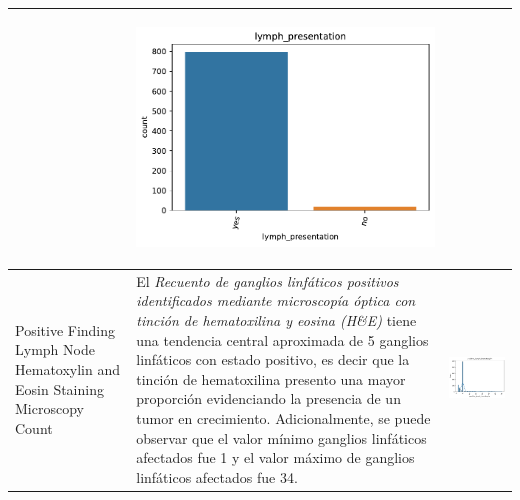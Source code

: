 \begin{table}[!htb]
\begin{threeparttable}
\begin{tabular}{p{2.5cm} p{7cm} p{6.5cm}}
			& \begin{center}\includegraphics[width=1\linewidth]{NOTEBOOK/IMAGENES_DESCRIPTIVAS/28_lymph_presentation}\end{center}
			\\ \hline
			
			Positive Finding Lymph Node Hematoxylin and Eosin Staining Microscopy Count
			& El \textit{Recuento de ganglios linfáticos positivos identificados mediante microscopía óptica con tinción de hematoxilina y eosina (H\&E)} tiene una tendencia central aproximada de 5 ganglios linfáticos con estado positivo, es decir que la tinción de hematoxilina presento una mayor proporción evidenciando la presencia de un tumor en crecimiento. Adicionalmente, se puede observar que  el valor mínimo ganglios linfáticos afectados fue 1 y el valor máximo de ganglios linfáticos afectados fue 34. 
			& \begin{center}\includegraphics[width=1\linewidth]{NOTEBOOK/IMAGENES_DESCRIPTIVAS/29_positive_lymph_hematoxylin}\end{center}
			\\ \hline
			

\end{tabular}
\end{threeparttable}
\end{table}
